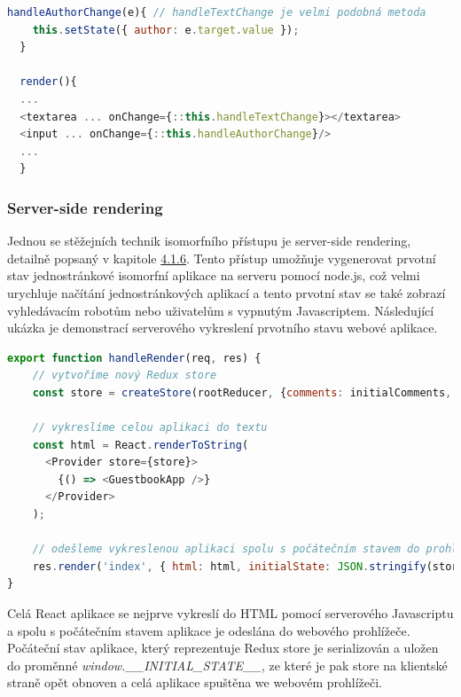\begin{lstlisting}[language=Javascript,caption={Ukázka propagace hodnot formulářových polí do stavu React komponenty}]
  handleAuthorChange(e){ // handleTextChange je velmi podobná metoda
    this.setState({ author: e.target.value });
  }
  
  render(){
  ...  
  <textarea ... onChange={::this.handleTextChange}></textarea>
  <input ... onChange={::this.handleAuthorChange}/>
  ...
  }
\end{lstlisting}

\subsubsection{Server-side rendering}
Jednou se stěžejních technik isomorfního přístupu je server-side rendering, detailně popsaný v kapitole \hyperref[sec:server_side_rendering]{4.1.6}. Tento přístup umožňuje vygenerovat prvotní stav jednostránkové isomorfní aplikace na serveru pomocí node.js, což velmi urychluje načítání jednostránkových aplikací a tento prvotní stav se také zobrazí vyhledávacím robotům nebo uživatelům s vypnutým Javascriptem. Následující ukázka je demonstrací serverového vykreslení prvotního stavu webové aplikace.
\begin{lstlisting}[language=Javascript,caption={Ukázka propagování stavu aplikace ze serveru do prohlížeče }]
export function handleRender(req, res) {  
    // vytvoříme nový Redux store
    const store = createStore(rootReducer, {comments: initialComments, userId: 'baseUser'}); // userId bude vytvořeno až v prohlížeči

    // vykreslíme celou aplikaci do textu
    const html = React.renderToString(
      <Provider store={store}>
        {() => <GuestbookApp />}
      </Provider>
    );

    // odešleme vykreslenou aplikaci spolu s počátečním stavem do prohlížeče
    res.render('index', { html: html, initialState: JSON.stringify(store.getState()) });
}
\end{lstlisting}

Celá React aplikace se nejprve vykreslí do HTML pomocí serverového Javascriptu a spolu s počátečním stavem aplikace je odeslána do webového prohlížeče. Počáteční stav aplikace, který reprezentuje Redux store je serializován a uložen do proměnné \textit{window.\_\_INITIAL\_STATE\_\_}, ze které je pak store na klientské straně opět obnoven a celá aplikace spuštěna we webovém prohlížeči.


